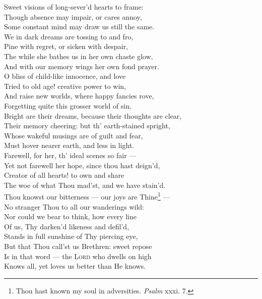  Sweet visions of long-sever’d hearts to frame: \\
 Though absence may impair, or cares annoy, \\
 Some constant mind may draw us still the same. \\
  We in dark dreams are tossing to and fro, \\
 Pine with regret, or sicken with despair, \\
 The while she bathes us in her own chaste glow, \\
 And with our memory wings her own fond prayer. \\
  O bliss of child-like innocence, and love \\
 Tried to old age! creative power to win, \\
 And raise new worlds, where happy fancies rove, \\
 Forgetting quite this grosser world of sin. \\
  Bright are their dreams, because their thoughts are clear, \\
 Their memory cheering: but th’ earth-stained spright, \\
 Whose wakeful musings are of guilt and fear, \\
 Must hover nearer earth, and less in light. \\
  Farewell, for her, th’ ideal scenes so fair — \\
 Yet not farewell her hope, since thou hast deign’d, \\
 Creator of all hearts! to own and share \\
 The woe of what Thou mad’st, and we have stain’d. \\
  Thou knowst our bitterness — our joys are Thine\footnote{Thou hast known my soul in adversities. \emph{Psalm} xxxi. 7.} — \\
 No stranger Thou to all our wanderings wild: \\
 Nor could we bear to think, how every line \\
 Of us, Thy darken’d likeness and defil’d, \\
  Stands in full sunshine of Thy piercing eye, \\
 But that Thou call’st us Brethren: sweet repose \\
 Is in that word — the \textsc{Lord} who dwells on high \\
 Knows all, yet loves us better than He knows.\\


